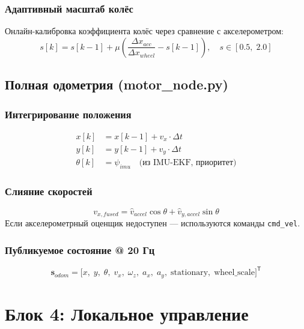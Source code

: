 \documentclass[12pt, a4paper]{article}
\newcommand{\T}{\mathsf{T}}       %
\begin{document}
\subsubsection{Адаптивный масштаб колёс}
Онлайн-калибровка коэффициента колёс через сравнение с акселерометром:
\begin{equation}
  s[k] = s[k-1] + \mu\left(\frac{\Delta x_{acc}}{\Delta x_{wheel}} - s[k-1]\right),
  \quad s \in [0.5,\; 2.0]
\end{equation}

\subsection{Полная одометрия (motor\_node.py)}
\label{sec:odom}

\subsubsection{Интегрирование положения}
\begin{align}
  x[k]      &= x[k-1] + v_x \cdot \Delta t \\
  y[k]      &= y[k-1] + v_y \cdot \Delta t \\
  \theta[k] &= \psi_{imu} \quad \text{(из IMU-EKF, приоритет)}
\end{align}

\subsubsection{Слияние скоростей}
\begin{equation}
  v_{x,fused} = \hat{v}_{accel}\cos\theta + \hat{v}_{y,accel}\sin\theta
\end{equation}
Если акселерометрный оценщик недоступен — используются команды \texttt{cmd\_vel}.

\subsubsection{Публикуемое состояние @ 20 Гц}
\begin{equation}
  \mathbf{s}_{odom} = \bigl[x,\; y,\; \theta,\; v_x,\; \omega_z,\; a_x,\; a_y,\;
  \text{stationary},\; \text{wheel\_scale}\bigr]^\T
\end{equation}

\newpage
\section{Блок 4: Локальное управление}
\label{sec:control}
\end{document}
